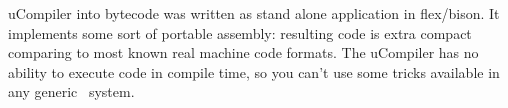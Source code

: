 \clearpage{}\label{ucompiler}

uCompiler into bytecode was written as stand alone application in flex/bison. It
implements some sort of portable assembly: resulting code is extra compact
comparing to most known real machine code formats. The uCompiler has no ability
to execute code in compile time, so you can't use some tricks available in
any generic \F\ system.
